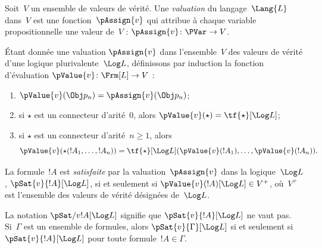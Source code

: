 \documentclass[../../../include/open-logic-section]{subfiles}
\begin{document}


\begin{defn}[Valuations]
Soit~$V$ un ensemble de valeurs de
vérité. Une \emph{valuation} du
langage~$\Lang{L}$ dans~$V$ est
une fonction~$\pAssign{v}$ qui
attribue à chaque variable
propositionnelle une valeur de~$V$ :
$\pAssign{v}\colon\PVar\to V$.
\end{defn}

\begin{defn}
Étant donnée une valuation
$\pAssign{v}$ dans l'ensemble~$V$
des valeurs de vérité d'une logique
plurivalente~$\Log L$, définissons
par induction la fonction d'évaluation
$\pValue{v}\colon\Frm[L]\to V$ :
\begin{enumerate}
\item $\pValue{v}(\Obj p_n)
  =\pAssign{v}(\Obj p_n)$;
\item si $\star$ est un connecteur
  d'arité~$0$, alors
  $\pValue{v}(\star)
    =\tf{\star}[\Log L]$;
\item si $\star$ est un connecteur
  d'arité~$n\geq1$, alors
  \[
    \pValue{v}(\star(!A_1,\dots,!A_n))
      =\tf{\star}[\Log L]
        (\pValue{v}(!A_1),\dots,
         \pValue{v}(!A_n)).
  \]
\end{enumerate}
\end{defn}

\begin{defn}[Satisfaction]
La formule~$!A$ est \emph{satisfaite}
par la valuation~$\pAssign{v}$
dans la logique~$\Log L$,
$\pSat{v}{!A}[\Log L]$, si et
seulement si
$\pValue{v}(!A)[\Log L]\in V^+$,
où~$V^+$ est l'ensemble des valeurs
de vérité désignées de~$\Log L$.

La notation $\pSat/{v}{!A}[\Log L]$
signifie que $\pSat{v}{!A}[\Log L]$
ne vaut pas. Si~$\Gamma$ est un
ensemble de formules, alors
$\pSat{v}{\Gamma}[\Log L]$ si et
seulement si $\pSat{v}{!A}[\Log L]$
pour toute formule~$!A\in\Gamma$.
\end{defn}
\end{document}
